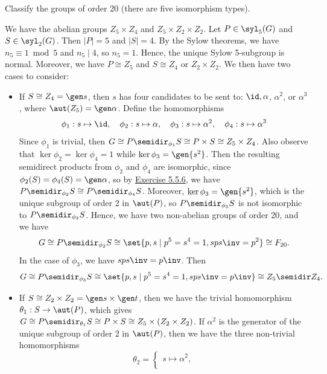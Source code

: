 \begin{exercise}\label{ex5.5.12}
    Classify the groups of order 20 (there are five isomorphism types).
\end{exercise}

\begin{sol}
    We have the abelian groups $Z_5 \times Z_4$ and $Z_5 \times Z_2 \times Z_2$. Let $P \in \syl_5(G)$ and $S \in \syl_2(G)$. Then $|P| = 5$ and $|S| = 4$. By the Sylow theorems, we have $n_5 \equiv 1 \bmod 5$ and $n_5 \mid 4$, so $n_5 = 1$. Hence, the unique Sylow 5-subgroup is normal. Moreover, we have $P \cong Z_5$ and $S \cong Z_4$ or $Z_2 \times Z_2$. We then have two cases to consider:
    \begin{itemize}
        \item If $S \cong Z_4 = \gen s$, then $s$ has four candidates to be sent to: $\id, \alpha$, $\alpha^2$, or $\alpha^3$, where $\aut(Z_5) = \gen\alpha$. Define the homomorphisms
        \[\phi_1 : s \mapsto \id, \quad \phi_2 : s \mapsto \alpha, \quad \phi_3 : s \mapsto \alpha^2, \quad \phi_4 : s \mapsto \alpha^3\]
        Since $\phi_1$ is trivial, then $G \cong P \semidir_{\phi_1} S \cong P \times S \cong Z_5 \times Z_4$. Also observe that $\ker\phi_2 = \ker\phi_4 = 1$ while $\ker\phi_3 = \gen{s^2}$. Then the resulting semidirect products from $\phi_2$ and $\phi_4$ are isomorphic, since $\phi_2(S) = \phi_4(S) = \gen\alpha$, so by \hyperref[ex5.5.6]{Exercise 5.5.6}, we have $P \semidir_{\phi_2} S \cong P \semidir_{\phi_4} S$. Moreover, $\ker\phi_3 = \gen{s^2}$, which is the unique subgroup of order 2 in $\aut(P)$, so $P \semidir_{\phi_3} S$ is not isomorphic to $P \semidir_{\phi_2} S$. Hence, we have two non-abelian groups of order 20, and we have
        \[G \cong P \semidir_{\phi_2} S \cong \set{p, s \mid p^5 = s^4 = 1, sps\inv = p^2} \cong F_{20}.\]
        In the case of $\phi_3$, we have $sps\inv = p\inv$. Then
        \[G \cong P \semidir_{\phi_3} S \cong \set{p, s \mid p^5 = s^4 = 1, sps\inv = p\inv} \cong Z_5 \semidir Z_4.\]
        \item If $S \cong Z_2 \times Z_2 = \gen s \times \gen t$, then we have the trivial homomorphism $\theta_1 : S \to \aut(P)$, which gives $G \cong P \semidir_{\theta_1} S \cong P \times S \cong Z_5 \times (Z_2 \times Z_2)$. If $\alpha^2$ is the generator of the unique subgroup of order 2 in $\aut(P)$, then we have the three non-trivial homomorphisms
        \[\theta_2 = 
        \begin{cases}
            s \mapsto \alpha^2, \\

\end{cases}\]
\end{itemize}
\end{sol}
